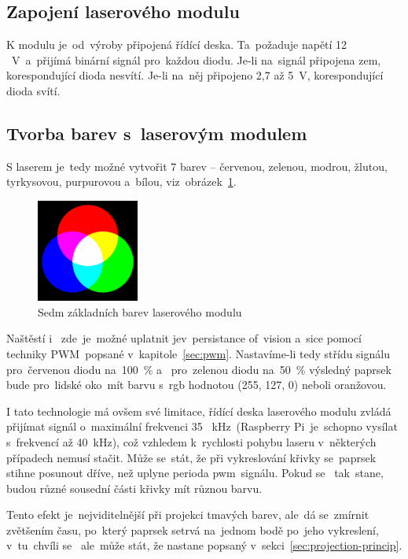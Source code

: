 \subsection{Zapojení laserového modulu}
K modulu je~od~výroby připojená řídící deska. Ta~požaduje napětí 12 ~V~a~přijímá binární signál pro~každou diodu. Je-li na~signál připojena zem, korespondující dioda nesvítí. Je-li na~něj připojeno 2,7 až 5~V, korespondující dioda svítí.

\subsection{Tvorba barev s~laserovým modulem}
S laserem je~tedy možné vytvořit 7 barev -- červenou, zelenou, modrou, žlutou, tyrkysovou, purpurovou a~bílou, viz~obrázek~\ref{fig:7colors}.

\begin{figure}[htb]
  \centering
  \includegraphics[width=0.3\textwidth]{img/7colors.png}
  \caption{\label{fig:7colors} Sedm základních barev laserového modulu}
\end{figure}

Naštěstí i ~zde~je~možné uplatnit jev~persistance of~vision a~sice pomocí techniky PWM~popsané v~kapitole~\ref{sec:pwm}.
Nastavíme-li tedy střídu signálu pro~červenou diodu na~100~\% a ~pro~zelenou diodu na~50~\% výsledný paprsek bude pro~lidské oko~mít barvu s~rgb hodnotou (255, 127, 0) neboli oranžovou.

I tato technologie má ovšem své limitace, řídící deska laserového modulu zvládá přijímat signál o~maximální frekvenci 35 ~kHz~(Raspberry Pi~je~schopno vysílat s~frekvencí až 40~kHz), což vzhledem k~rychlosti pohybu laseru v~některých případech nemusí stačit.
Může se~stát, že při vykreslování křivky se~paprsek stihne posunout dříve, než uplyne perioda pwm~signálu. Pokud se ~tak~stane, budou různé sousední části křivky mít různou barvu.


Tento efekt je~nejviditelnější při projekci tmavých barev, ale~dá se~zmírnit zvětšením času, po~který paprsek setrvá na~jednom bodě po~jeho vykreslení, v~tu~chvíli se ~ale~může stát, že nastane  popsaný v~sekci~\ref{sec:projection-princip}.